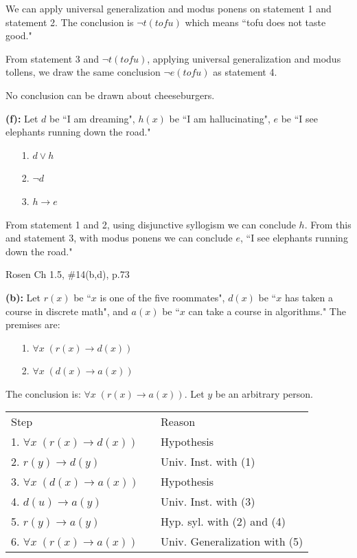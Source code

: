 \documentclass[12pt]{exam}
\begin{document}
\begin{questions}
\begin{solution}
    \smallskip
    We can apply universal generalization and modus ponens on statement 1 and statement 2.  The conclusion is $\neg t(tofu)$ which means ``tofu does not taste good."

    From statement 3 and $\neg t(tofu)$, applying universal generalization and modus tollens, we draw the same conclusion $\neg e(tofu)$ as statement 4.

    No conclusion can be drawn about cheeseburgers.

    \medskip
    \textbf{(f):} Let $d$ be ``I am dreaming", $h(x)$ be ``I am hallucinating", $e$ be ``I see elephants running down
    the road."
    \begin{itemize}
        \item[1.] $d \vee h$
        \item[2.] $\neg d$
        \item[3.] $h \rightarrow e$
    \end{itemize}

    \smallskip
    From statement 1 and 2, using disjunctive syllogism we can
    conclude $h$. From this and statement 3, with modus ponens we
    can conclude $e$, ``I see elephants running down the road."
    \end{solution}


\question Rosen Ch 1.5, \#14(b,d), p.73
    \begin{solution}
    \textbf{(b):} Let $r(x)$ be ``$x$ is one of the five roommates", $d(x)$ be ``$x$ has taken a course in discrete math", and $a(x)$ be ``$x$ can take a course in algorithms." The premises are:
    \begin{itemize}
        \item[1.] $\forall x\;(r(x) \rightarrow d(x))$
        \item[2.] $\forall x\;(d(x) \rightarrow a(x))$
    \end{itemize}
    The conclusion is: $\forall x\;(r(x) \rightarrow a(x))$.  Let $y$ be an arbitrary person.

    \smallskip
    \begin{tabular}{lll}
        Step        & \hspace{0.2in} & Reason \\
        1. $\forall x\;(r(x) \rightarrow d(x))$     &   & Hypothesis \\
        2. $r(y) \rightarrow d(y)$                  & & Univ. Inst. with (1) \\
        3. $\forall x\; (d(x) \rightarrow a(x))$    &   & Hypothesis \\
        4. $d(u) \rightarrow a(y)$                  &   & Univ. Inst. with (3) \\
        5. $r(y) \rightarrow a(y)$                  &   & Hyp. syl. with (2) and (4) \\
        6. $\forall x\;(r(x) \rightarrow a(x))$     &   & Univ. Generalization with (5) \\
    \end{tabular}


\end{solution}
\end{questions}
\end{document}
